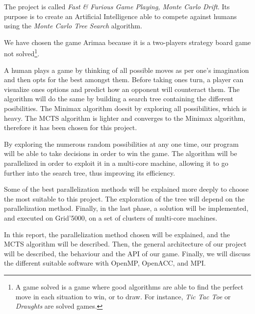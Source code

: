 The project is called \emph{Fast \& Furious Game Playing, Monte Carlo Drift}. Its purpose is to create an Artificial Intelligence able to compete against humans using the \emph{Monte Carlo Tree Search} algorithm.

We have chosen the game Arimaa because it is a two-players strategy board game not solved\footnote{A game solved is a game where good algorithms are able to find the perfect move in each situation to win, or to draw. For instance, \textit{Tic Tac Toe} or \textit{Draughts} are solved games.}.

A human plays a game by thinking of all possible moves as per one's imagination and then opts for the best amongst them. Before taking ones turn, a player can visualize ones options and predict how an opponent will counteract them. The algorithm will do the same by building a search tree containing the different posibilities. The Minimax algorithm doesit by exploring all possibilities, which is heavy. The MCTS algorithm is lighter and converges to the Minimax algorithm, therefore it has been chosen for this project.

By exploring the numerous random possibilities at any one time, our program will be able to take decisions in order to win the game.
The algorithm will be parallelized in order to exploit it in a multi-core machine, allowing it to go further into the search tree, thus improving its efficiency.

Some of the best parallelization methods will be explained more deeply to choose the most suitable to this project.
The exploration of the tree will depend on the parallelization method.
Finally, in the last phase, a solution will be implemented, and executed on Grid'5000, on a set of clusters of multi-core machines.


In this report, the parallelization method chosen will be explained, and the MCTS algorithm will be described.
Then, the general architecture of our project will be described, the behaviour and the API of our game.
Finally, we will discuss the different suitable software with OpenMP, OpenACC, and MPI.
